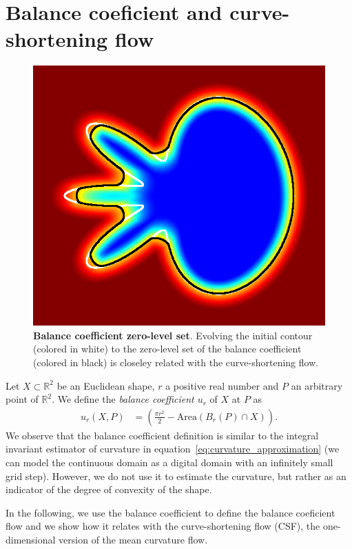\documentclass[smallextended]{svjour3}
\newcommand{\R}{\mathbb{R}}
\begin{document}
\section{Balance coeficient and curve-shortening flow}
%
%
\begin{figure}
 \center
 \includegraphics[scale=0.32]{figures/zero-level-set/balance-coefficient-zero-level-set.png}
 \caption{\textbf{Balance coefficient zero-level set}. Evolving the initial contour (colored in white) to the zero-level set of the balance coefficient (colored in black) is closeley related with the curve-shortening flow.}
 \label{fig:balance-coefficient-zero-level-set}
 \end{figure}
%
%
Let $X \subset \R^2$ be an Euclidean shape, $r$ a positive real number and $P$ an arbitrary point of $\R^2$. We define the \emph{balance coefficient $u_r$} of $X$ at $P$ as
%
%
\begin{align*}
  u_r(X,P) &= \left( \frac{\pi r^2}{2} - \text{Area}(B_r(P) \cap X) \right).
\end{align*}
%
%
We observe that the balance coefficient definition is similar to the
integral invariant estimator of curvature in
equation~\eqref{eq:curvature_approximation} (we can model the
continuous domain as a digital domain with an infinitely small grid
step). However, we do not use it to estimate the curvature, but rather
as an indicator of the degree of convexity of the shape.

In the following, we use the balance coefficient to define the balance
coeficient flow and we show how it relates with the curve-shortening
flow (CSF), the one-dimensional version of the mean curvature flow.
\end{document}
